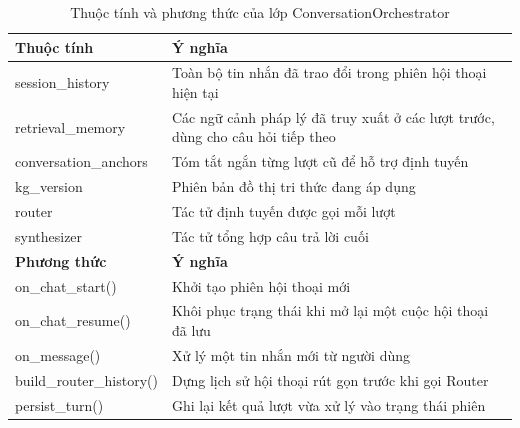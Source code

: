 \documentclass[../DoAn.tex]{subfiles}
\begin{document}
\begin{table}[H]
\centering
\small
\renewcommand{\arraystretch}{1.12}
\begin{tabular}{|p{4.8cm}|p{9.2cm}|}
\hline
\textbf{Thuộc tính} & \textbf{Ý nghĩa} \\ \hline
session\_history & Toàn bộ tin nhắn đã trao đổi trong phiên hội thoại hiện tại \\ \hline
retrieval\_memory & Các ngữ cảnh pháp lý đã truy xuất ở các lượt trước, dùng cho câu hỏi tiếp theo \\ \hline
conversation\_anchors & Tóm tắt ngắn từng lượt cũ để hỗ trợ định tuyến \\ \hline
kg\_version & Phiên bản đồ thị tri thức đang áp dụng \\ \hline
router & Tác tử định tuyến được gọi mỗi lượt \\ \hline
synthesizer & Tác tử tổng hợp câu trả lời cuối \\ \hline
\textbf{Phương thức} & \textbf{Ý nghĩa} \\ \hline
on\_chat\_start() & Khởi tạo phiên hội thoại mới \\ \hline
on\_chat\_resume() & Khôi phục trạng thái khi mở lại một cuộc hội thoại đã lưu \\ \hline
on\_message() & Xử lý một tin nhắn mới từ người dùng \\ \hline
build\_router\_history() & Dựng lịch sử hội thoại rút gọn trước khi gọi Router \\ \hline
persist\_turn() & Ghi lại kết quả lượt vừa xử lý vào trạng thái phiên \\ \hline
\end{tabular}
\caption{Thuộc tính và phương thức của lớp ConversationOrchestrator}
\label{tab:class-conversation-orchestrator}
\end{table}
\end{document}
